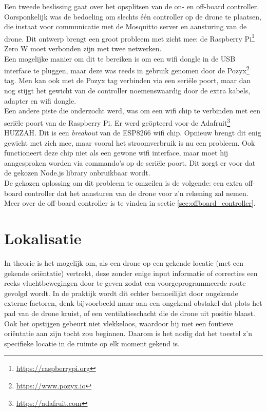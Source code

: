 Een tweede beslissing gaat over het opsplitsen van de on- en off-board controller.
Oorsponkelijk was de bedoeling om slechts één controller op de drone te plaatsen, die instaat voor communicatie met de Mosquitto server en aansturing van de drone.
Dit ontwerp brengt een groot probleem met zicht mee: de Raspberry Pi\footnote{\url{https://raspberrypi.org}} Zero W moet verbonden zijn met twee netwerken.\\
Een mogelijke manier om dit te bereiken is om een wifi dongle in de USB interface te pluggen, maar deze was reeds in gebruik genomen door de Pozyx\footnote{\url{https://www.pozyx.io}} tag.
Men kan ook met de Pozyx tag verbinden via een seriële poort, maar dan nog stijgt het gewicht van de controller noemenswaardig door de extra kabels, adapter en wifi dongle.\\
Een andere piste die onderzocht werd, was om een wifi chip te verbinden met een seriële poort van de Raspberry Pi.
Er werd geöpteerd voor de Adafruit\footnote{\url{https://adafruit.com}} HUZZAH.
Dit is een \textit{breakout} van de ESP8266 wifi chip.
Opnieuw brengt dit enig gewicht met zich mee, maar vooral het stroomverbruik is nu een probleem.
Ook functioneert deze chip niet als een gewone wifi interface, maar moet hij aangesproken worden via commando's op de seriële poort.
Dit zorgt er voor dat de gekozen Node.js library onbruikbaar wordt.\\
De gekozen oplossing om dit probleem te omzeilen is de volgende: een extra off-board controller dat het aansturen van de drone voor z'n rekening zal nemen.
Meer over de off-board controller is te vinden in sectie \ref{sec:offboard_controller}.

\section{Lokalisatie} \label{sec:localization}
In theorie is het mogelijk om, als een drone op een gekende locatie (met een gekende ori\"entatie) vertrekt, deze zonder enige input informatie of correcties een reeks vluchtbewegingen door te geven zodat een voorgeprogrammeerde route gevolgd wordt.
In de praktijk wordt dit echter bemoeilijkt door ongekende externe factoren, denk bijvoorbeeld maar aan een ongekend obstakel dat plots het pad van de drone kruist, of een ventilatieschacht die de drone uit positie blaast.
Ook het opstijgen gebeurt niet vlekkeloos, waardoor hij met een foutieve ori\"entatie aan zijn tocht zou beginnen.
Daarom is het nodig dat het toestel z'n specifieke locatie in de ruimte op elk moment gekend is.\\

